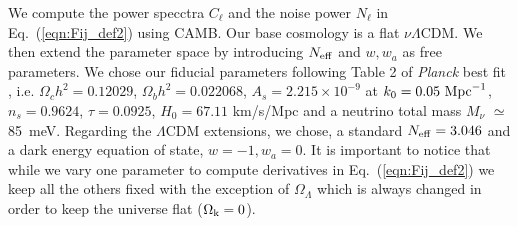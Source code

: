 \documentclass[aps,prd,reprint,superscriptaddress]{revtex4-1}
\newcommand\refeq[1]{Eq.~(\ref{eqn:#1})}
\begin{document}
%

We compute the power specctra $C_{\ell}$ and the noise power $N_{\ell}$ in \refeq{Fij_def2} using CAMB.
Our base cosmology is a flat $\nu \Lambda$CDM. 
We then extend the parameter space by introducing $N_{\rm eff}$ and $w,w_{a}$ as free parameters.
We chose our fiducial parameters following Table 2 of \textit{Planck} best fit \cite{planck-collaboration:2014g}, i.e. $\Omega_c h^2 = 0.12029$, $\Omega_b h^2 = 0.022068$, $A_s = 2.215\times10^{-9}$ at $k_0 = 0.05\ {\rm Mpc}^{-1}$, $n_s = 0.9624$, $\tau = 0.0925$, $H_0 = 67.11$ km/s/Mpc and a neutrino total mass $M_{\nu}$ $\simeq$ 85\ meV. 
Regarding the $\Lambda$CDM extensions, we chose, a standard $N_{\rm eff}=3.046$ and a dark energy equation of state, $w=-1,w_{a}=0$.
It is important to notice that while we vary one parameter to compute derivatives in \refeq{Fij_def2} we keep all the others fixed with the exception of $\Omega_{\Lambda}$ which is always changed in order to keep the universe flat ($\Omega_{\rm k} = 0$).
\end{document}
